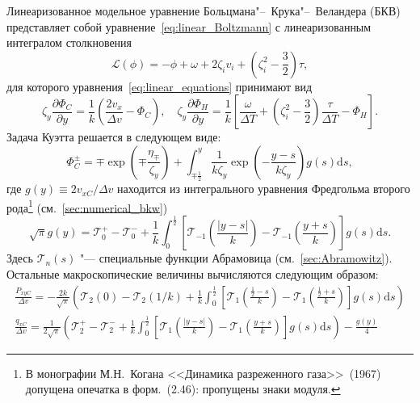 \documentclass[a4paper,12pt]{article}
\newcommand{\dd}{\mathrm{d}}
\newcommand{\pder}[2][]{\frac{\partial#1}{\partial#2}}
\begin{document}
Линеаризованное модельное уравнение Больцмана"--~Крука"--~Веландера (БКВ)
представляет собой уравнение~\eqref{eq:linear_Boltzmann} с линеаризованным интегралом столкновения
\begin{equation}\label{eq:linear_bkw}
    \mathcal{L}(\phi) = -\phi + \omega + 2\zeta_i v_i + \left(\zeta_i^2-\frac32\right)\tau,
\end{equation}
для которого уравнения~\eqref{eq:linear_equations} принимают вид
\begin{equation}\label{eq:linear_bkw_equations}
    \zeta_y \pder[\Phi_C]{y} = \frac1{k}\left( \frac{2v_x}{\Delta{v}} - \Phi_C \right), \quad
    \zeta_y \pder[\Phi_H]{y} = \frac1{k}\left[ \frac{\omega}{\Delta{T}}
        + \left(\zeta_i^2-\frac32\right)\frac{\tau}{\Delta{T}} - \Phi_H \right].
\end{equation}
Задача Куэтта решается в следующем виде:
\begin{equation}\label{eq:bkw_couette}
    \Phi_C^\pm = \mp \exp\left(\mp\frac{\eta_\mp}{\zeta_y}\right) +
        \int_{\mp\frac12}^y \frac1{k\zeta_y} \exp \left(-\frac{y-s}{k\zeta_y}\right) g(s) \dd{s},
\end{equation}
где \(g(y) \equiv 2v_{xC}/\Delta v\) находится из интегрального уравнения Фредгольма второго рода\footnote{
    В монографии М.Н.~Когана <<Динамика разреженного газа>>~(1967)~\cite{Kogan1967}
    допущена опечатка в форм.~(2.46): пропущены знаки модуля.
} (см.~\cref{sec:numerical_bkw})
\begin{equation}\label{eq:bkw_g_equation}
    \sqrt\pi g(y) = \mathcal{T}_0^+ - \mathcal{T}_0^-
        + \frac1k \int_0^{\frac12} \left[ \mathcal{T}_{-1}\left(\frac{|y-s|}{k}\right)
        - \mathcal{T}_{-1}\left(\frac{y+s}{k}\right) \right] g(s) \dd{s}.
\end{equation}
Здесь \(\mathcal{T}_n(s)\) "--- специальные функции Абрамовица (см.~\cref{sec:Abramowitz}).
Остальные макроскопические величины вычисляются следующим образом:
\begin{gather}\label{eq:bkw_couette_macro}
    \frac{P_{xyC}}{\Delta v} = -\frac{2k}{\sqrt\pi} \left(
        \mathcal{T}_2(0)-\mathcal{T}_2(1/k)
        + \frac1k\int_0^{\frac12}\left[
            \mathcal{T}_1\left(\frac{\frac12-s}k\right)-\mathcal{T}_1\left(\frac{\frac12+s}k\right)
        \right]g(s)\dd{s}
        \right) \\
    \frac{q_{xC}}{\Delta v} = \frac1{2\sqrt\pi}\left(
        \mathcal{T}_2^+-\mathcal{T}_2^-
        + \frac1k\int_0^{\frac12}\left[
            \mathcal{T}_1\left(\frac{|y-s|}k\right)-\mathcal{T}_1\left(\frac{y+s}k\right)
        \right]g(s)\dd{s}
        \right) - \frac{g(y)}4
\end{gather}
\end{document}
